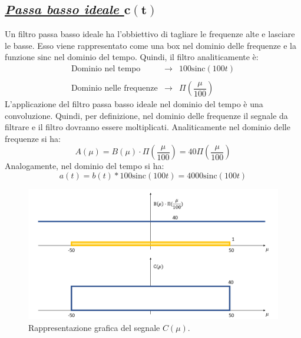 \documentclass[a4paper]{article}
\begin{document}
	\subsection*{\textcolor{Green4}{\emph{\underline{Passa basso ideale $\boldsymbol{c\left(t\right)}$}}}}
	
	Un filtro passa basso ideale ha l'obbiettivo di tagliare le frequenze alte e lasciare le basse. Esso viene rappresentato come una box nel dominio delle frequenze e la funzione $\mathrm{sinc}$ nel dominio del tempo. Quindi, il filtro analiticamente è:
	\begin{equation*}
		\begin{array}{lll}
			\text{Dominio nel tempo} 		& \longrightarrow & 100\mathrm{sinc}\left(100t\right) \\
			\\
			\text{Dominio nelle frequenze} 	& \longrightarrow & \Pi\left(\dfrac{\mu}{100}\right)
		\end{array}
	\end{equation*}
	L'applicazione del filtro passa basso ideale nel dominio del tempo è una convoluzione. Quindi, per definizione, nel dominio delle frequenze il segnale da filtrare e il filtro dovranno essere moltiplicati. Analiticamente nel dominio delle frequenze si ha:
	\begin{equation*}
		A\left(\mu\right) = B\left(\mu\right) \cdot \Pi\left(\dfrac{\mu}{100}\right) = 40\Pi\left(\dfrac{\mu}{100}\right)
	\end{equation*}
	Analogamente, nel dominio del tempo si ha:
	\begin{equation*}
		a\left(t\right) = b\left(t\right) * 100\mathrm{sinc}\left(100t\right) = 4000\mathrm{sinc}\left(100t\right)
	\end{equation*}
	\begin{figure}[!htp]
		\centering
		\includegraphics[width=\textwidth]{img/fig_4.png}
		\caption*{Rappresentazione grafica del segnale $C\left(\mu\right)$.}
	\end{figure}\newpage
\end{document}
